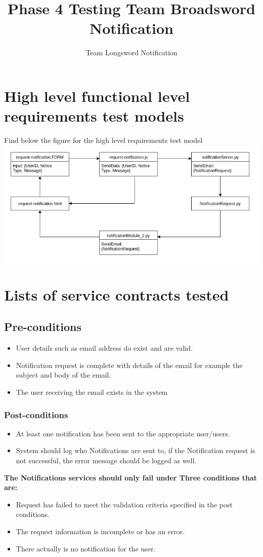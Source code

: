 \documentclass[11pt]{article}
\author{Team Longsword Notification}
\title{Phase 4 Testing Team Broadsword Notification}
\begin{document}
	\setlength{\parskip}{6pt}
	
	
	
	\tableofcontents
	
	\newpage
	
\section{High level functional level requirements test models}
		\begin{center}
			Find below the figure for the high level requirements test model
			\includegraphics[width=0.7\linewidth]{Images/TestModelDiagram.jpg}\\[1cm]  
		\end{center}
\section{Lists of service contracts tested}
	\subsection{Pre-conditions}
	\begin{itemize}
		\item User details such as email address do exist and are valid.
		\item Notification request is complete with details of the email for example the subject and body of the email.
		\item The user receiving the email exists in the system
	\end{itemize}
	\subsubsection{Post-conditions}
	\begin{itemize}
		\item At least one notification has been sent to the appropriate user/users.
		\item System should log who Notifications are sent to, if the Notification request is not successful, the error message should be logged as well.
	\end{itemize}
	\textbf{The Notifications services should only fail under Three conditions that are:}
	\begin{itemize}
		\item Request has failed to meet the validation criteria specified in the post conditions.
		\item The request information is incomplete or has an error.
		\item There actually is no notification for the user.
	\end{itemize}
\end{document}
